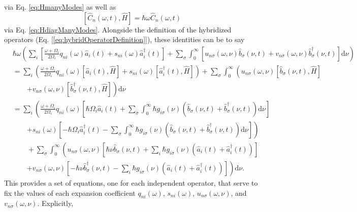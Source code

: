 via Eq. \eqref{eq:HmanyModes} as well as
\begin{equation}
\left[\hat{C}_n(\omega,t),\hat{H}\right] = \hbar\omega\hat{C}_n(\omega,t)
\end{equation}
via Eq. \eqref{eq:HdiagManyModes}. Alongside the definition of the hybridized operators (Eq. [\ref{eq:hybridOperatorDefinition}]), these identities can be to say
\begin{equation}
\begin{split}
&\hbar\omega\left(\sum_i\left[\frac{\omega + \Omega_i}{2\Omega_i}q_{ni}(\omega)\hat{a}_i(t) + s_{ni}(\omega)\hat{a}^\dagger_i(t)\right] + \sum_\sigma\int_0^\infty\left[u_{n\sigma}(\omega,\nu)\hat{b}_\sigma(\nu,t) + v_{n\sigma}(\omega,\nu)\hat{b}_\sigma^\dagger(\nu,t)\right]\mathrm{d}\nu\right)\\
&= \sum_i\left(\frac{\omega + \Omega_i}{2\Omega_i}q_{ni}(\omega)\left[\hat{a}_i(t),\hat{H}\right] + s_{ni}(\omega)\left[\hat{a}_i^\dagger(t),\hat{H}\right]\right) + \sum_\sigma\int_0^\infty\left(u_{n\sigma}(\omega,\nu)\left[\hat{b}_\sigma(\nu,t),\hat{H}\right]\right.\\
&\qquad\left. + v_{n\sigma}(\omega,\nu)\left[\hat{b}_\sigma^\dagger(\nu,t),\hat{H}\right]\right)\mathrm{d}\nu\\
&= \sum_i\left(\frac{\omega + \Omega_i}{2\Omega_i}q_{ni}(\omega)\left[\hbar\Omega_i\hat{a}_i(t) + \sum_\sigma\int_0^\infty\hbar g_{i\sigma}(\nu)\left(\hat{b}_\sigma(\nu,t) + \hat{b}_\sigma^\dagger(\nu,t)\right)\mathrm{d}\nu\right]\right.\\
&\qquad\left. + s_{ni}(\omega)\left[-\hbar\Omega_i\hat{a}_i^\dagger(t) - \sum_\sigma\int_0^\infty\hbar g_{i\sigma}(\nu)\left(\hat{b}_\sigma(\nu,t) + \hat{b}_\sigma^\dagger(\nu,t)\right)\mathrm{d}\nu\right]\right)\\
&\qquad + \sum_\sigma\int_0^\infty\left(u_{n\sigma}(\omega,\nu)\left[\hbar\nu \hat{b}_\sigma(\nu,t) + \sum_i\hbar g_{i\sigma}(\nu)\left(\hat{a}_i(t) + \hat{a}_i^\dagger(t)\right)\right]\right.\\
&\qquad\left. + v_{n\sigma}(\omega,\nu)\left[-\hbar\nu \hat{b}_\sigma^\dagger(\nu,t) - \sum_i\hbar g_{i\sigma}(\nu)\left(\hat{a}_i(t) + \hat{a}_i^\dagger(t)\right)\right] \right)\mathrm{d}\nu.
\end{split}
\end{equation}
This provides a set of equations, one for each independent operator, that serve to fix the values of each expansion coefficient $q_{ni}(\omega)$, $s_{ni}(\omega)$, $u_{n\sigma}(\omega,\nu)$, and $v_{n\sigma}(\omega,\nu)$. Explicitly,
